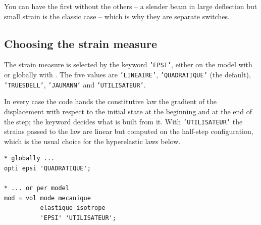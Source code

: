 \noindent You can have the first without the others -- a slender beam in
large deflection but small strain is the classic case -- which is why they
are separate switches.

\subsection{Choosing the strain measure}

\begin{castemcom}
%
%
%
The strain measure is selected by the keyword \texttt{'EPSI'}, either on the
model with  or globally with . The five values are
\texttt{'LINEAIRE'}, \texttt{'QUADRATIQUE'} (the default),
\texttt{'TRUESDELL'}, \texttt{'JAUMANN'} and \texttt{'UTILISATEUR'}.

In every case the code hands the constitutive law the gradient of the
displacement with respect to the initial state at the beginning and at the
end of the step; the keyword decides what is built from it. With
\texttt{'UTILISATEUR'} the strains passed to the law are linear but computed
on the half-step configuration, which is the usual choice for the
hyperelastic laws below.
\end{castemcom}
\begin{castemlines}
\begin{verbatim}
* globally ...
opti epsi 'QUADRATIQUE';

* ... or per model
mod = vol mode mecanique
          elastique isotrope
          'EPSI' 'UTILISATEUR';
\end{verbatim}
\end{castemlines}


